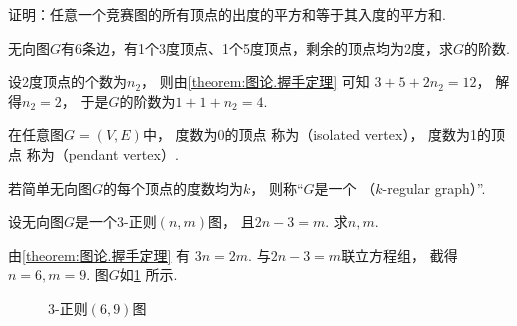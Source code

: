 \begin{example}
证明：任意一个竞赛图的所有顶点的出度的平方和等于其入度的平方和.
\end{example}

\begin{example}
无向图\(G\)有6条边，有1个3度顶点、1个5度顶点，剩余的顶点均为2度，求\(G\)的阶数.
\begin{solution}
设2度顶点的个数为\(n_2\)，
则由\cref{theorem:图论.握手定理} 可知
\(3 + 5 + 2 n_2 = 12\)，
解得\(n_2 = 2\)，
于是\(G\)的阶数为\(1 + 1 + n_2 = 4\).
\end{solution}
\end{example}

\begin{definition}
在任意图\(G = (V,E)\)中，
度数为0的顶点
称为（isolated vertex），
度数为1的顶点
称为（pendant vertex）.
\end{definition}

\begin{definition}
若简单无向图\(G\)的每个顶点的度数均为\(k\)，
则称“\(G\)是一个 （\(k\)-regular graph）”.
\end{definition}

\begin{example}
设无向图\(G\)是一个\(3\)-正则\((n,m)\)图，
且\(2n-3=m\).
求\(n,m\).
\begin{solution}
由\cref{theorem:图论.握手定理} 有
\(3n = 2m\).
与\(2n-3=m\)联立方程组，
截得\(n=6,m=9\).
图\(G\)如\cref{figure:图论.正则图1} 所示.
\begin{figure}[hbt]
	\centering
	\def\n{3}  %
	\def\b{90}  %
	\caption{$3$-正则$(6,9)$图}
	\label{figure:图论.正则图1}
\end{figure}
\end{solution}
\end{example}

